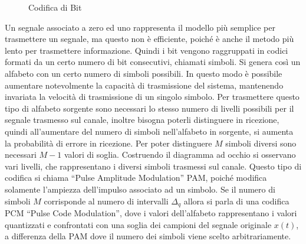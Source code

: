 \documentclass{article}
\numberwithin{equation}{subsection}
\begin{document}
\begin{figure}[H]%
    \centering
    \qquad
    \caption{Codifica di Bit}
\end{figure}
Un segnale associato a zero ed uno rappresenta il modello più semplice per trasmettere un segnale, ma questo non è efficiente, poiché è anche il metodo più lento per 
trasmettere informazione. Quindi i bit vengono raggruppati in codici formati da un certo numero di bit consecutivi, chiamati simboli. Si genera così un alfabeto con un 
certo numero di simboli possibili. In questo modo è possibile aumentare notevolmente la 
capacità di trasmissione del sistema, mantenendo invariata la velocità di trasmissione di un singolo simbolo.  
Per trasmettere questo tipo di alfabeto sorgente sono necessari lo stesso numero di livelli possibili per il segnale trasmesso sul canale, inoltre bisogna poterli distinguere 
in ricezione, quindi all'aumentare del numero di simboli nell'alfabeto in sorgente, si aumenta la probabilità di errore in ricezione. Per poter distinguere $M$ 
simboli diversi sono necessari $M-1$ valori di soglia. Costruendo il diagramma ad occhio si osservano vari livelli, che rappresentano i diversi simboli trasmessi sul canale. Questo tipo di codifica si 
chiama ``Pulse Amplitude Modulation'' PAM, poiché modifica solamente l'ampiezza dell'impulso associato ad un simbolo. Se il numero di simboli $M$ 
corrisponde al numero di intervalli $\Delta_q$ allora si parla di una codifica PCM ``Pulse Code Modulation'', dove i valori dell'alfabeto rappresentano 
i valori quantizzati e confrontati con una soglia dei campioni del segnale originale $x(t)$, a differenza della PAM dove il numero dei simboli viene scelto 
arbitrariamente. 
\end{document}
